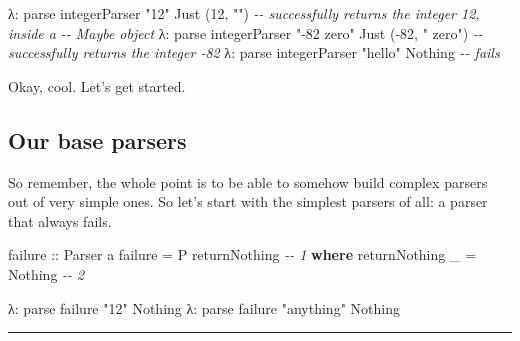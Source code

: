 \documentclass[]{article}
\newenvironment{Shaded}{}{}
\newcommand{\CommentTok}[1]{\textcolor[rgb]{0.38,0.63,0.69}{\textit{#1}}}
\newcommand{\DataTypeTok}[1]{\textcolor[rgb]{0.56,0.13,0.00}{#1}}
\newcommand{\DecValTok}[1]{\textcolor[rgb]{0.25,0.63,0.44}{#1}}
\newcommand{\KeywordTok}[1]{\textcolor[rgb]{0.00,0.44,0.13}{\textbf{#1}}}
\newcommand{\NormalTok}[1]{#1}
\newcommand{\OperatorTok}[1]{\textcolor[rgb]{0.40,0.40,0.40}{#1}}
\newcommand{\OtherTok}[1]{\textcolor[rgb]{0.00,0.44,0.13}{#1}}
\newcommand{\StringTok}[1]{\textcolor[rgb]{0.25,0.44,0.63}{#1}}
\begin{document}
\begin{Shaded}
\begin{Highlighting}[]
\NormalTok{λ}\OperatorTok{:}\NormalTok{ parse integerParser }\StringTok{"12"}
\DataTypeTok{Just}\NormalTok{ (}\DecValTok{12}\NormalTok{, }\StringTok{""}\NormalTok{)               }\CommentTok{{-}{-} successfully returns the integer 12, inside a}
                            \CommentTok{{-}{-} Maybe object}
\NormalTok{λ}\OperatorTok{:}\NormalTok{ parse integerParser }\StringTok{"{-}82 zero"}
\DataTypeTok{Just}\NormalTok{ (}\OperatorTok{{-}}\DecValTok{82}\NormalTok{, }\StringTok{" zero"}\NormalTok{)         }\CommentTok{{-}{-} successfully returns the integer {-}82}
\NormalTok{λ}\OperatorTok{:}\NormalTok{ parse integerParser }\StringTok{"hello"}
\DataTypeTok{Nothing}                     \CommentTok{{-}{-} fails}
\end{Highlighting}
\end{Shaded}

Okay, cool. Let's get started.

\subsection{Our base parsers}\label{our-base-parsers}

So remember, the whole point is to be able to somehow build complex parsers out
of very simple ones. So let's start with the simplest parsers of all: a parser
that always fails.

\begin{Shaded}
\begin{Highlighting}[]
\OtherTok{failure ::} \DataTypeTok{Parser}\NormalTok{ a}
\NormalTok{failure }\OtherTok{=} \DataTypeTok{P}\NormalTok{ returnNothing                   }\CommentTok{{-}{-} 1}
    \KeywordTok{where}
\NormalTok{        returnNothing \_ }\OtherTok{=} \DataTypeTok{Nothing}           \CommentTok{{-}{-} 2}
\end{Highlighting}
\end{Shaded}

\begin{Shaded}
\begin{Highlighting}[]
\NormalTok{λ}\OperatorTok{:}\NormalTok{ parse failure }\StringTok{"12"}
\DataTypeTok{Nothing}
\NormalTok{λ}\OperatorTok{:}\NormalTok{ parse failure }\StringTok{"anything"}
\DataTypeTok{Nothing}
\end{Highlighting}
\end{Shaded}

\begin{center}\rule{0.5\linewidth}{0.5pt}\end{center}
\end{document}
